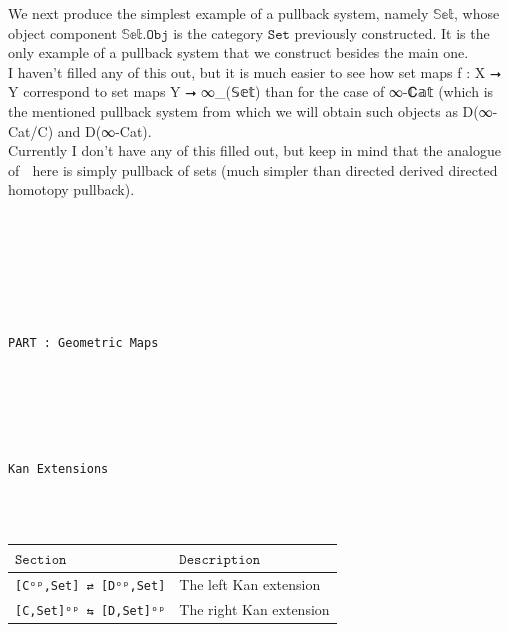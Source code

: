 \documentclass{book}
\theoremstyle{definition}
\newcounter{pcounter}
\newcounter{lcounter}
\renewcommand{\chapter}[1]{
\newpage
{
\Huge 
\begin{center}
\ \\
\ \\
\thispagestyle{empty}
\texttt{#1}
\end{center}}
\ \\
\ \\
}
\newcounter{partcount}
\renewcommand{\part}[1]{
\newpage
{
\Huge 
\begin{center}
\ \\
\ \\
\ \\
\ \\
\ \\
\ \\
\thispagestyle{empty}
\texttt{PART {\thepartcount}: #1}
\stepcounter{partcount}
\end{center}}
\ \\
\ \\
}
\begin{document}
{{We next produce the simplest example of a pullback system, namely $\texttt{𝕊𝕖𝕥}$, whose object component $\texttt{𝕊𝕖𝕥.Obj}$ is the category $\texttt{Set}$ previously constructed. It is the only example of a pullback system that we construct besides the main one.\\

I haven't filled any of this out, but it is much easier to see how set maps f : X ⭢ Y correspond to set maps Y ⭢ ∞\_(𝕊𝕖𝕥) than for the case of ∞-ℂ𝕒𝕥 (which is the mentioned pullback system from which we will obtain such objects as D(∞-Cat/C) and D(∞-Cat).\\

Currently I don't have any of this filled out, but keep in mind that the analogue of ω⃗ here is simply pullback of sets (much simpler than directed derived directed homotopy pullback).\\



\part{Geometric Maps}





\chapter{Kan Extensions}

{\footnotesize
\begin{center}
\begin{tabular}{|| l || l ||} 
 \hline
 $\texttt{Section}$ & $\texttt{Description}$ \\
 \hline
\hline
\texttt{[Cᵒᵖ,Set] ⇄ [Dᵒᵖ,Set]} & The left Kan extension \\
\hline
\texttt{[C,Set]ᵒᵖ ⇆ [D,Set]ᵒᵖ} & The right Kan extension \\
\hline
\end{tabular}
\end{center}}
\ \\
\ \\



\begin{center}
\begin{tcolorbox}[width=5in,colback={white},title={\begin{center}\texttt{Lean \thelcounter} \addtocounter{lcounter}{1}  \end{center}},colbacktitle=Blue,coltitle=black]
\begin{verbatim}


\end{verbatim}
\end{tcolorbox}
\end{center}}}
\end{document}
